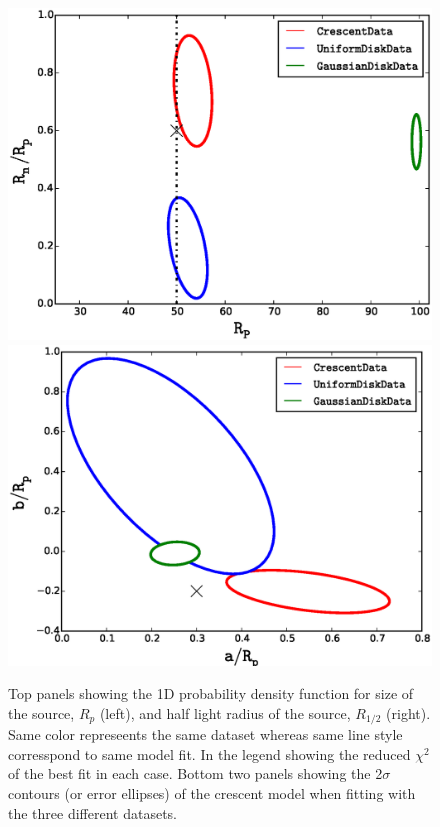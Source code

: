 \begin{figure}
\centering
  \includegraphics[width=0.9\hsize]{plots/Rhalf_RnRp.eps}
  \includegraphics[width=0.9\hsize]{plots/aRp_bRp.eps}
\caption{\label{fig:mcmc} Top panels showing the 1D probability density function for size of the source, $R_p$ (left), and half light radius of the source, $R_{1/2}$ (right). Same color represeents the same dataset whereas same line style corresspond to same model fit. In the legend showing the reduced $\chi^2$ of the best fit in each case. Bottom two panels showing the 2$\sigma$ contours (or error ellipses) of the crescent model when fitting with the three different datasets.}
\end{figure}

